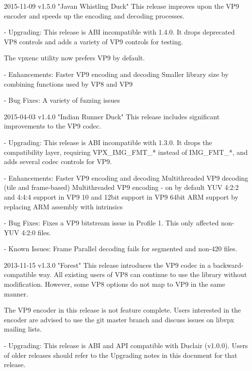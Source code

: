 
\begin{DoxyVerbInclude}
2015-11-09 v1.5.0 "Javan Whistling Duck"
  This release improves upon the VP9 encoder and speeds up the encoding and
  decoding processes.

  - Upgrading:
    This release is ABI incompatible with 1.4.0. It drops deprecated VP8
    controls and adds a variety of VP9 controls for testing.

    The vpxenc utility now prefers VP9 by default.

  - Enhancements:
    Faster VP9 encoding and decoding
    Smaller library size by combining functions used by VP8 and VP9

  - Bug Fixes:
    A variety of fuzzing issues

2015-04-03 v1.4.0 "Indian Runner Duck"
  This release includes significant improvements to the VP9 codec.

  - Upgrading:
    This release is ABI incompatible with 1.3.0. It drops the compatibility
    layer, requiring VPX_IMG_FMT_* instead of IMG_FMT_*, and adds several codec
    controls for VP9.

  - Enhancements:
    Faster VP9 encoding and decoding
    Multithreaded VP9 decoding (tile and frame-based)
    Multithreaded VP9 encoding - on by default
    YUV 4:2:2 and 4:4:4 support in VP9
    10 and 12bit support in VP9
    64bit ARM support by replacing ARM assembly with intrinsics

  - Bug Fixes:
    Fixes a VP9 bitstream issue in Profile 1. This only affected non-YUV 4:2:0
    files.

  - Known Issues:
    Frame Parallel decoding fails for segmented and non-420 files.

2013-11-15 v1.3.0 "Forest"
  This release introduces the VP9 codec in a backward-compatible way.
  All existing users of VP8 can continue to use the library without
  modification. However, some VP8 options do not map to VP9 in the same manner.

  The VP9 encoder in this release is not feature complete. Users interested in
  the encoder are advised to use the git master branch and discuss issues on
  libvpx mailing lists.

  - Upgrading:
    This release is ABI and API compatible with Duclair (v1.0.0). Users
    of older releases should refer to the Upgrading notes in this document
    for that release.


\end{DoxyVerbInclude}
